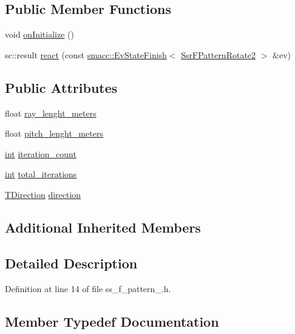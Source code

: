 \subsection*{Public Member Functions}
\begin{DoxyCompactItemize}
\item 
void \hyperlink{structSS4_1_1SsFPattern1_af4dca5dae22315ddcfed435d277791b0}{on\+Initialize} ()
\item 
sc\+::result \hyperlink{structSS4_1_1SsFPattern1_a133a70236087b3e12c55f5e46bcfd2d9}{react} (const \hyperlink{structsmacc_1_1EvStateFinish}{smacc\+::\+Ev\+State\+Finish}$<$ \hyperlink{structSsrFPatternRotate2}{Ssr\+F\+Pattern\+Rotate2} $>$ \&ev)
\end{DoxyCompactItemize}
\subsection*{Public Attributes}
\begin{DoxyCompactItemize}
\item 
float \hyperlink{structSS4_1_1SsFPattern1_a72803a7a7ce8025ee7aa36726f3aaefc}{ray\+\_\+lenght\+\_\+meters}
\item 
float \hyperlink{structSS4_1_1SsFPattern1_affb031c56b95d731f868bda21bf9c37e}{pitch\+\_\+lenght\+\_\+meters}
\item 
\hyperlink{classint}{int} \hyperlink{structSS4_1_1SsFPattern1_ab86bc79bcbe1b0f61a8aff73c87845ba}{iteration\+\_\+count}
\item 
\hyperlink{classint}{int} \hyperlink{structSS4_1_1SsFPattern1_ac7c81f3b8a44de58fad91a7be3af03c0}{total\+\_\+iterations}
\item 
\hyperlink{namespaceSS4_ac7fa695c4f9dc0b99e73fcbbf5311282}{T\+Direction} \hyperlink{structSS4_1_1SsFPattern1_a4f18d9734ab8894ffcdbdaa3673af910}{direction}
\end{DoxyCompactItemize}
\subsection*{Additional Inherited Members}


\subsection{Detailed Description}


Definition at line 14 of file ss\+\_\+f\+\_\+pattern\+\_.\+h.



\subsection{Member Typedef Documentation}
